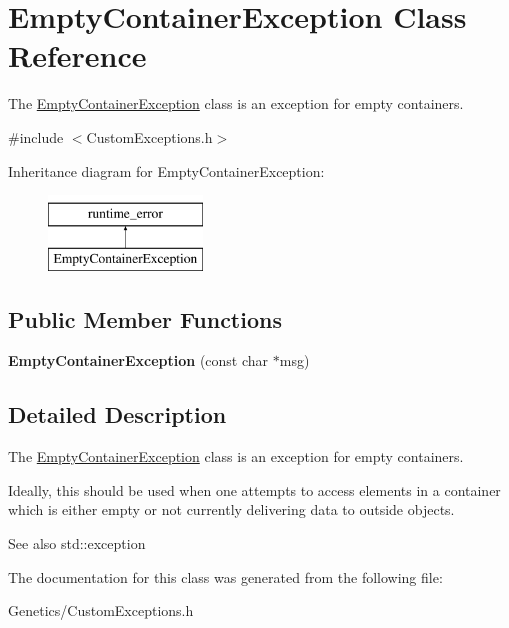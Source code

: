 \hypertarget{class_empty_container_exception}{}\section{Empty\+Container\+Exception Class Reference}
\label{class_empty_container_exception}


The \hyperlink{class_empty_container_exception}{Empty\+Container\+Exception} class is an exception for empty containers.  




{\ttfamily \#include $<$Custom\+Exceptions.\+h$>$}

Inheritance diagram for Empty\+Container\+Exception\+:\begin{figure}[H]
\begin{center}
\leavevmode
\includegraphics[height=2.000000cm]{class_empty_container_exception}
\end{center}
\end{figure}
\subsection*{Public Member Functions}
\begin{DoxyCompactItemize}
\item 
\hypertarget{class_empty_container_exception_a821dfadd04f39f9d394d868c2aff2105}{}{\bfseries Empty\+Container\+Exception} (const char $\ast$msg)\label{class_empty_container_exception_a821dfadd04f39f9d394d868c2aff2105}

\end{DoxyCompactItemize}


\subsection{Detailed Description}
The \hyperlink{class_empty_container_exception}{Empty\+Container\+Exception} class is an exception for empty containers. 

Ideally, this should be used when one attempts to access elements in a container which is either empty or not currently delivering data to outside objects. \begin{DoxySeeAlso}{See also}
std\+::exception 
\end{DoxySeeAlso}


The documentation for this class was generated from the following file\+:\begin{DoxyCompactItemize}
\item 
Genetics/Custom\+Exceptions.\+h\end{DoxyCompactItemize}
